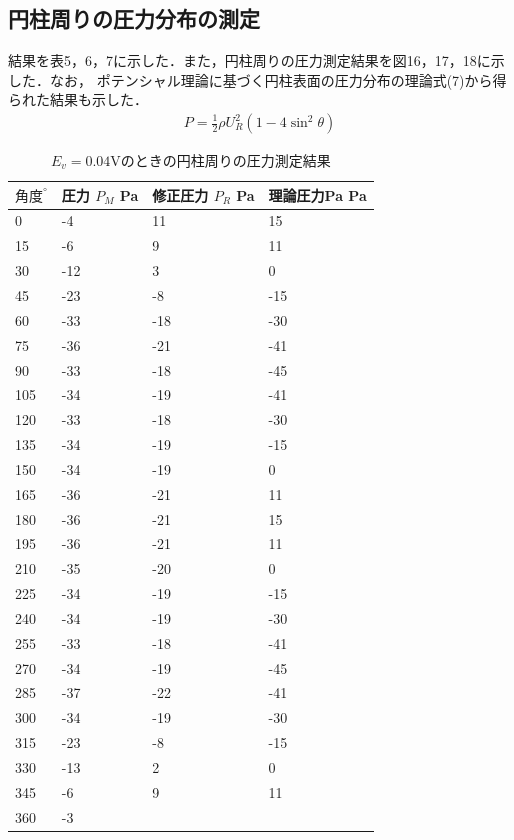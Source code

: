 \documentclass[twocolumn,10pt,a4j]{jsarticle}
\begin{document}
  \subsection{円柱周りの圧力分布の測定}
    結果を表5，6，7に示した．また，円柱周りの圧力測定結果を図16，17，18に示した．なお，
    ポテンシャル理論に基づく円柱表面の圧力分布の理論式(7)から得られた結果も示した．
    \begin{eqnarray}
      P = \frac{1}{2} \rho U_{R}^2(1-4 \sin^2 \theta)
    \end{eqnarray}
      \begin{table}[]
        \centering
          \caption{$E_{v}=0.04$Vのときの円柱周りの圧力測定結果}
          \label{my-label}
          \footnotesize
          \begin{tabular}{llll}
            $角度^\circ$ & 圧力 $P_{M}$ Pa & 修正圧力 $P_{R}$ Pa & 理論圧力Pa Pa\\ \hline
            0	& -4 & 	11&  	15 \\
            15&	-6 & 	9 & 	11  \\
            30&-12&3&0  \\
            45&-23& 	-8& 	-15  \\
            60&	-33& 	-18& 	-30  \\
            75&	-36& 	-21& 	-41  \\
            90&	-33& 	-18& 	-45  \\
            105&-34& 	-19& 	-41  \\
            120	&-33& 	-18& 	-30  \\
            135&	-34& 	-19& 	-15  \\
            150&-34& 	-19& 	0  \\
            165&	-36& 	-21& 	11  \\
            180&	-36& 	-21& 	15  \\
            195&	-36& 	-21& 	11  \\
            210&	-35& 	-20& 	0  \\
            225&	-34& 	-19& 	-15  \\
            240&	-34& 	-19& 	-30  \\
            255&	-33& 	-18& 	-41  \\
            270&	-34& 	-19& 	-45  \\
            285&	-37& 	-22& 	-41  \\
            300&	-34& 	-19& 	-30  \\
            315&	-23& 	-8& 	-15  \\
            330&	-13& 	2& 	0  \\
            345&	-6& 	9& 	11 \\ 
            360&	-3& 		 
          \end{tabular}
      \end{table}
\end{document}
